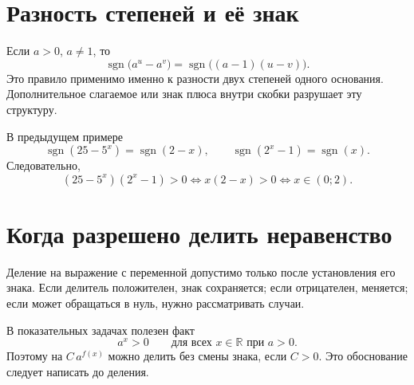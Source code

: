 \documentclass[a4paper,12pt]{article}
\newcommand{\R}{\mathbb{R}}
\begin{document}
\section{Разность степеней и её знак}

Если $a>0$, $a\ne1$, то
\[
\operatorname{sgn}\bigl(a^u-a^v\bigr)
=\operatorname{sgn}\bigl((a-1)(u-v)\bigr).
\]
Это правило применимо именно к разности двух степеней одного основания. Дополнительное слагаемое или знак плюса внутри скобки разрушает эту структуру.

В предыдущем примере
\[
\operatorname{sgn}(25-5^x)=\operatorname{sgn}(2-x),
\qquad
\operatorname{sgn}(2^x-1)=\operatorname{sgn}(x).
\]
Следовательно,
\[
(25-5^x)(2^x-1)>0
\iff x(2-x)>0
\iff\boxed{x\in(0;2)}.
\]

\begin{center}
\end{center}

\section{Когда разрешено делить неравенство}

Деление на выражение с переменной допустимо только после установления его знака. Если делитель положителен, знак сохраняется; если отрицателен, меняется; если может обращаться в нуль, нужно рассматривать случаи.

В показательных задачах полезен факт
\[
a^x>0\qquad\text{для всех }x\in\R\text{ при }a>0.
\]
Поэтому на $C\,a^{f(x)}$ можно делить без смены знака, если $C>0$. Это обоснование следует написать до деления.
\end{document}
